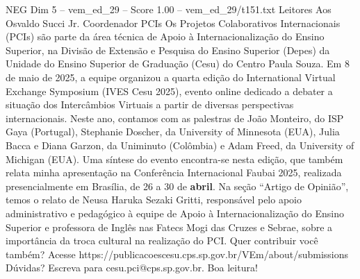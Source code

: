 \begin{textsample}{NEG Dim 5 – vem\_ed\_29 – Score 1.00 – vem\_ed\_29/t151.txt}  \label{ex:f5_neg_126}
Leitores Aos Osvaldo Succi Jr.
Coordenador PCIs Os Projetos Colaborativos Internacionais (PCIs) são parte da área técnica de Apoio à Internacionalização do Ensino Superior, na Divisão de Extensão e Pesquisa do Ensino Superior (Depes) da Unidade do Ensino Superior de Graduação (Cesu) do Centro Paula Souza.
Em 8 de maio de 2025, a equipe organizou a quarta edição do International Virtual Exchange Symposium (IVES Cesu 2025), evento online dedicado a debater a situação dos Intercâmbios Virtuais a partir de diversas perspectivas internacionais.
Neste ano, contamos com as palestras de João Monteiro, do ISP Gaya (Portugal), Stephanie Doscher, da University of Minnesota (EUA), Julia Bacca e Diana Garzon, da Uniminuto (Colômbia) e Adam Freed, da University of Michigan (EUA).
Uma síntese do evento encontra-se nesta edição, que também relata minha apresentação na Conferência Internacional Faubai 2025, realizada presencialmente em Brasília, de 26 a 30 de \textbf{abril}.
Na seção “Artigo de Opinião”, temos o relato de Neusa Haruka Sezaki Gritti, responsável pelo apoio administrativo e pedagógico à equipe de Apoio à Internacionalização do Ensino Superior e professora de Inglês nas Fatecs Mogi das Cruzes e Sebrae, sobre a importância da troca cultural na realização do PCI.
Quer contribuir você também?
Acesse https://publicacoescesu.cps.sp.gov.br/VEm/about/submissions Dúvidas?
Escreva para cesu.pci@cps.sp.gov.br.
Boa leitura!

\end{textsample}
